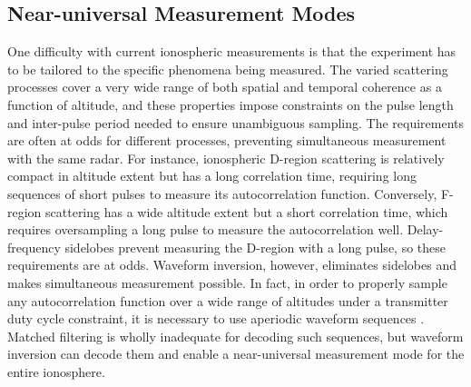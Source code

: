 \subsection{Near-universal Measurement Modes}
One difficulty with current ionospheric measurements is that the experiment has to be tailored to the specific phenomena being measured. The varied scattering processes cover a very wide range of both spatial and temporal coherence as a function of altitude, and these properties impose constraints on the pulse length and inter-pulse period needed to ensure unambiguous sampling. The requirements are often at odds for different processes, preventing simultaneous measurement with the same radar. For instance, ionospheric D-region scattering is relatively compact in altitude extent but has a long correlation time, requiring long sequences of short pulses to measure its autocorrelation function. Conversely, F-region scattering has a wide altitude extent but a short correlation time, which requires oversampling a long pulse to measure the autocorrelation well. Delay-frequency sidelobes prevent measuring the D-region with a long pulse, so these requirements are at odds. Waveform inversion, however, eliminates sidelobes and makes simultaneous measurement possible. In fact, in order to properly sample any autocorrelation function over a wide range of altitudes under a transmitter duty cycle constraint, it is necessary to use aperiodic waveform sequences \autocite{VVL09}. Matched filtering is wholly inadequate for decoding such sequences, but waveform inversion can decode them and enable a near-universal measurement mode for the entire ionosphere.